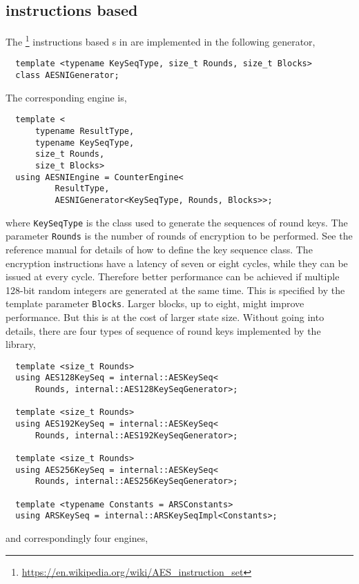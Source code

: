 \subsection{\texorpdfstring{\protect\aesni}{AES-NI} instructions based
  \texorpdfstring{\protect\rng}{RNG}}
\label{sub:AES-NI instructions based RNG}

The \aesni\footnote{\url{https://en.wikipedia.org/wiki/AES_instruction_set}}
instructions based \rng{}s in \cite{Salmon:2011um} are implemented in the
following generator,
\begin{Verbatim}
  template <typename KeySeqType, size_t Rounds, size_t Blocks>
  class AESNIGenerator;
\end{Verbatim}
The corresponding \rng engine is,
\begin{Verbatim}
  template <
      typename ResultType,
      typename KeySeqType,
      size_t Rounds,
      size_t Blocks>
  using AESNIEngine = CounterEngine<
          ResultType,
          AESNIGenerator<KeySeqType, Rounds, Blocks>>;
\end{Verbatim}
where \verb|KeySeqType| is the class used to generate the sequences of round
keys. The parameter \verb|Rounds| is the number of rounds of \aes encryption to
be performed. See the reference manual for details of how to define the key
sequence class. The \aesni encryption instructions have a latency of seven or
eight cycles, while they can be issued at every cycle. Therefore better
performance can be achieved if multiple 128-bit random integers are generated
at the same time. This is specified by the template parameter \verb|Blocks|.
Larger blocks, up to eight, might improve performance. But this is at the cost
of larger state size. Without going into details, there are four types of
sequence of round keys implemented by the library,
\begin{Verbatim}
  template <size_t Rounds>
  using AES128KeySeq = internal::AESKeySeq<
      Rounds, internal::AES128KeySeqGenerator>;

  template <size_t Rounds>
  using AES192KeySeq = internal::AESKeySeq<
      Rounds, internal::AES192KeySeqGenerator>;

  template <size_t Rounds>
  using AES256KeySeq = internal::AESKeySeq<
      Rounds, internal::AES256KeySeqGenerator>;

  template <typename Constants = ARSConstants>
  using ARSKeySeq = internal::ARSKeySeqImpl<Constants>;
\end{Verbatim}
and correspondingly four \rng engines,
